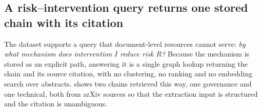 \documentclass[10pt,twocolumn,letterpaper]{article}
\begin{document}
\subsection{A risk--intervention query returns one stored chain with its citation}
\label{sec:r-retrieval}

The dataset supports a query that document-level resources cannot serve: \emph{by what
mechanism does intervention $I$ reduce risk $R$?} Because the mechanism is stored as an
explicit path, answering it is a single graph lookup returning the chain and its source
citation, with no clustering, no ranking and no embedding search over abstracts.
 shows two chains retrieved this way, one governance and one technical,
both from arXiv sources so that the extraction input is structured and the citation is
unambiguous.
\end{document}
